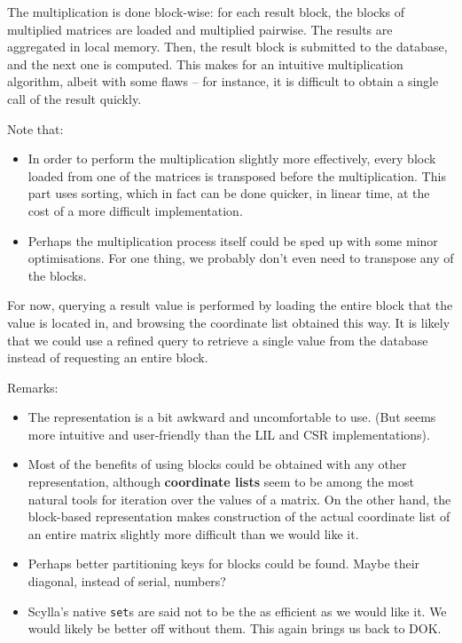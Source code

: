 \documentclass{article}
\newcommand{\code}[0]{\texttt}
\begin{document}
The multiplication is done block-wise: for each result block, the blocks of multiplied matrices are loaded and multiplied pairwise. The results are aggregated in local memory. Then, the result block is submitted to the database, and the next one is computed. This makes for an intuitive multiplication algorithm, albeit with some flaws -- for instance, it is difficult to obtain a single call of the result quickly. 

Note that:
\begin{itemize}
\item In order to perform the multiplication slightly more effectively, every block loaded from one of the matrices is transposed before the multiplication. This part uses sorting, which in fact can be done quicker, in linear time, at the cost of a more difficult implementation. 
\item Perhaps the multiplication process itself could be sped up with some minor optimisations. For one thing, we probably don't even need to transpose any of the blocks.
\end{itemize}

For now, querying a result value is performed by loading the entire block that the value is located in, and browsing the coordinate list obtained this way. It is likely that we could use a refined query to retrieve a single value from the database instead of requesting an entire block. 

Remarks: 
\begin{itemize} 
\item The representation is a bit awkward and uncomfortable to use. (But seems more intuitive and user-friendly than the LIL and CSR implementations).
\item Most of the benefits of using blocks could be obtained with any other representation, although \textbf{coordinate lists} seem to be among the most natural tools for iteration over the values of a matrix. On the other hand, the block-based representation makes construction of the actual coordinate list of an entire matrix slightly more difficult than we would like it.
\item Perhaps better partitioning keys for blocks could be found. Maybe their diagonal, instead of serial, numbers?
\item Scylla's native \code{set}s are said not to be the as efficient as we would like it. We would likely be better off without them. This again brings us back to DOK.
\end{itemize}
\end{document}
